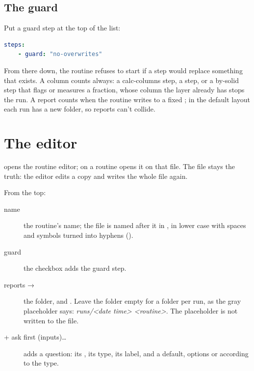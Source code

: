 \subsection{The guard}\label{sec:routines-guard}
Put a guard step at the top of the list:

\begin{lstlisting}[language=yaml]
  steps:
    - guard: "no-overwrites"
\end{lstlisting}

From there down, the routine refuses to start if a step would replace something that exists. A column counts always: a calc-columns step, a  step, or a by-solid step that flags or measures a fraction, whose column the layer already has stops the run. A report counts when the routine writes to a fixed ; in the default layout each run has a new folder, so reports can't collide.

\section{The editor}\label{sec:routines-editor}
 opens the routine editor;  on a routine opens it on that file. The file stays the truth: the editor edits a copy and  writes the whole file again.


From the top:

\begin{description}
\item[name] the routine's name; the file is named after it in , in lower case with spaces and symbols turned into hyphens ().
\item[guard] the checkbox  adds the guard step.
\item[reports →] the  folder,  and . Leave the folder empty for a folder per run, as the gray placeholder says: \emph{runs/<date time> <routine>}. The placeholder is not written to the file.
\item[+ ask first (inputs)…] adds a question: its , its type, its label, and a default, options or  according to the type.
\end{description}

